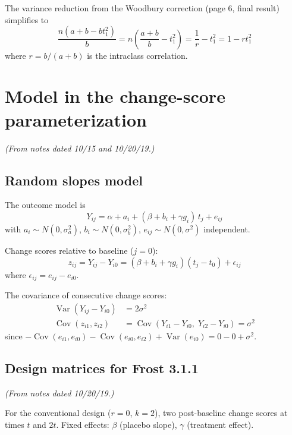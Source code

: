 \documentclass[11pt]{article}
\DeclareMathOperator{\Var}{Var}
\DeclareMathOperator{\Cov}{Cov}
\begin{document}
The variance reduction from the Woodbury correction
(page 6, final result) simplifies to
\begin{equation}
  \frac{n(a + b - bt_1^2)}{b}
  = n\!\left(\frac{a+b}{b} - t_1^2\right)
  = \frac{1}{r} - t_1^2
  = 1 - rt_1^2
\end{equation}
where $r = b/(a+b)$ is the intraclass correlation.


\section{Model in the change-score parameterization}
\label{sec:changescore}

\noindent
\textit{(From notes dated 10/15 and 10/20/19.)}

\subsection{Random slopes model}

The outcome model is
\begin{equation}
  Y_{ij} = \alpha + a_i + (\beta + b_i + \gamma g_i)\,t_j
    + e_{ij}
\end{equation}
with $a_i \sim N(0, \sigma_a^2)$, $b_i \sim N(0, \sigma_b^2)$,
$e_{ij} \sim N(0, \sigma^2)$ independent.

Change scores relative to baseline ($j = 0$):
\begin{equation}
  z_{ij} = Y_{ij} - Y_{i0}
  = (\beta + b_i + \gamma g_i)(t_j - t_0) + \epsilon_{ij}
\end{equation}
where $\epsilon_{ij} = e_{ij} - e_{i0}$.

The covariance of consecutive change scores:
\begin{align}
  \Var(Y_{ij} - Y_{i0}) &= 2\sigma^2 \\
  \Cov(z_{i1}, z_{i2})
    &= \Cov(Y_{i1} - Y_{i0},\; Y_{i2} - Y_{i0})
    = \sigma^2
\end{align}
since $-\Cov(e_{i1}, e_{i0}) - \Cov(e_{i0}, e_{i2})
+ \Var(e_{i0}) = 0 - 0 + \sigma^2$.


\subsection{Design matrices for Frost 3.1.1}
\label{sec:frost311}

\noindent
\textit{(From notes dated 10/20/19.)}

\medskip
\noindent
For the conventional design ($r = 0$, $k = 2$),
two post-baseline change scores at times $t$ and $2t$.
Fixed effects: $\beta$ (placebo slope), $\gamma$ (treatment
effect).
\end{document}

